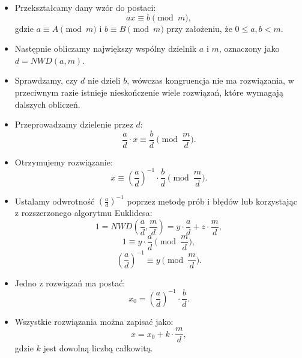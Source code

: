 \documentclass{SGGW-thesis}
\begin{document}
	\begin{itemize}
		\item Przekształcamy dany wzór do postaci:
		\begin{equation}
			ax \equiv b \pmod{m},
		\end{equation}
		gdzie \( a \equiv A \pmod{m} \) i \( b \equiv B \pmod{m} \) przy założeniu, że \( 0 \leq a, b < m \).
		\item Następnie obliczamy największy wspólny dzielnik \( a \) i \( m \), oznaczony jako \( d = NWD(a, m) \).
		\item Sprawdzamy, czy \( d \) nie dzieli \( b \), wówczas kongruencja nie ma rozwiązania, w przeciwnym razie istnieje nieskończenie wiele rozwiązań, które wymagają dalszych obliczeń.
		\item Przeprowadzamy dzielenie przez \( d \):
		\begin{equation}
			\frac{a}{d} \cdot x \equiv \frac{b}{d} \pmod{\frac{m}{d}}.
		\end{equation}
		\item Otrzymujemy rozwiązanie:
		\begin{equation}
			x \equiv \left(\frac{a}{d}\right)^{-1} \cdot \frac{b}{d} \pmod{\frac{m}{d}}.
		\end{equation}
		\item Ustalamy odwrotność \( \left(\frac{a}{d}\right)^{-1} \) poprzez metodę prób i błędów lub korzystając z rozszerzonego algorytmu Euklidesa:
		\begin{equation}
			1 = NWD\left(\frac{a}{d}, \frac{m}{d}\right) = y \cdot \frac{a}{d} + z \cdot \frac{m}{d},
		\end{equation}
		\begin{equation}
			1 \equiv y \cdot \frac{a}{d} \pmod{\frac{m}{d}},
		\end{equation}
		\begin{equation}
			\left(\frac{a}{d}\right)^{-1} \equiv y \pmod{\frac{m}{d}}.
		\end{equation}
		\item Jedno z rozwiązań ma postać:
		\begin{equation}
			x_0 = \left(\frac{a}{d}\right)^{-1} \cdot \frac{b}{d}.
		\end{equation}
		\item Wszystkie rozwiązania można zapisać jako:
		\begin{equation}
			x = x_0 + k \cdot \frac{m}{d},
		\end{equation}
		gdzie \( k \) jest dowolną liczbą całkowitą.
	\end{itemize}
	\newpage
	
\end{document}
